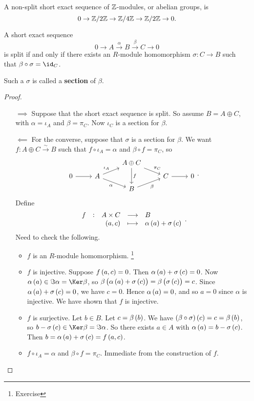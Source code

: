 \begin{example*}
A non-split short exact sequence of $ \mathbb{Z} $-modules, or abelian groups, is
$$ 0 \to \mathbb{Z} / 2\mathbb{Z} \to \mathbb{Z} / 4\mathbb{Z} \to \mathbb{Z} / 2\mathbb{Z} \to 0. $$
\end{example*}

\begin{proposition}
A short exact sequence
$$ 0 \to A \xrightarrow{\alpha} B \xrightarrow{\beta} C \to 0 $$
is split if and only if there exists an $ R $-module homomorphism $ \sigma : C \to B $ such that $ \beta \circ \sigma = \id_C $.
\end{proposition}

Such a $ \sigma $ is called a \textbf{section} of $ \beta $.

\begin{proof}
\hfill
\begin{itemize}
\item[$ \implies $] Suppose that the short exact sequence is split. So assume $ B = A \oplus C $, with $ \alpha = \iota_A $ and $ \beta = \pi_C $. Now $ \iota_C $ is a section for $ \beta $.
\item[$ \impliedby $] For the converse, suppose that $ \sigma $ is a section for $ \beta $. We want $ f : A \oplus C \xrightarrow{\sim} B $ such that $ f \circ \iota_A = \alpha $ and $ \beta \circ f = \pi_C $, so
$$
\begin{tikzcd}[row sep=tiny]
& & A \oplus C \arrow{dr}{\pi_C} \arrow{dd}{f} & & \\
0 \arrow{r} & A \arrow{ur}{\iota_A} \arrow[swap]{dr}{\alpha} & & C \arrow{r} & 0 \\
& & B \arrow[swap]{ur}{\beta} & &
\end{tikzcd}.
$$
Define
$$ \function[f]{A \times C}{B}{\br{a, c}}{\alpha\br{a} + \sigma\br{c}}. $$
Need to check the following.
\begin{itemize}
\item $ f $ is an $ R $-module homomorphism. \footnote{Exercise}
\item $ f $ is injective. Suppose $ f\br{a, c} = 0 $. Then $ \alpha\br{a} + \sigma\br{c} = 0 $. Now $ \alpha\br{a} \in \Im \alpha = \Ker \beta $, so $ \beta\br{\alpha\br{a} + \sigma\br{c}} = \beta\br{\sigma\br{c}} = c $. Since $ \alpha\br{a} + \sigma\br{c} = 0 $, we have $ c = 0 $. Hence $ \alpha\br{a} = 0 $, and so $ a = 0 $ since $ \alpha $ is injective. We have shown that $ f $ is injective.
\item $ f $ is surjective. Let $ b \in B $. Let $ c = \beta\br{b} $. We have $ \br{\beta \circ \sigma}\br{c} = c = \beta\br{b} $, so $ b - \sigma\br{c} \in \Ker \beta = \Im \alpha $. So there exists $ a \in A $ with $ \alpha\br{a} = b - \sigma\br{c} $. Then $ b = \alpha\br{a} + \sigma\br{c} = f\br{a, c} $.
\item $ f \circ \iota_A = \alpha $ and $ \beta \circ f = \pi_C $. Immediate from the construction of $ f $.
\end{itemize}
\end{itemize}
\end{proof}

